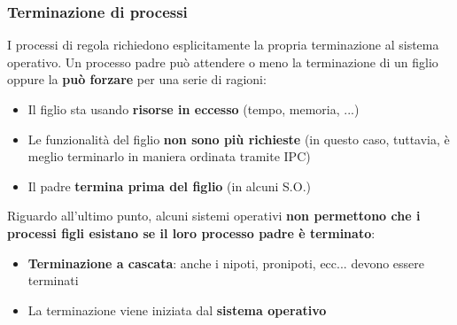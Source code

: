 \documentclass[12pt]{article}
\begin{document}
\subsubsection{Terminazione di processi}
I processi di regola richiedono esplicitamente la propria terminazione al sistema operativo. 
Un processo padre può attendere o meno la terminazione di un figlio oppure la \textbf{può forzare} per una serie di ragioni:
\begin{itemize}
    \item Il figlio sta usando \textbf{risorse in eccesso} (tempo, memoria, ...)
    \item Le funzionalità del figlio \textbf{non sono più richieste} (in questo caso, tuttavia, è meglio terminarlo in maniera ordinata tramite IPC)
    \item Il padre \textbf{termina prima del figlio} (in alcuni S.O.)
\end{itemize}
Riguardo all'ultimo punto, alcuni sistemi operativi \textbf{non permettono che i processi figli esistano se il loro processo padre è terminato}:
\begin{itemize}
    \item \textbf{Terminazione a cascata}: anche i nipoti, pronipoti, ecc... devono essere terminati
    \item La terminazione viene iniziata dal \textbf{sistema operativo}
\end{itemize}
\end{document}
